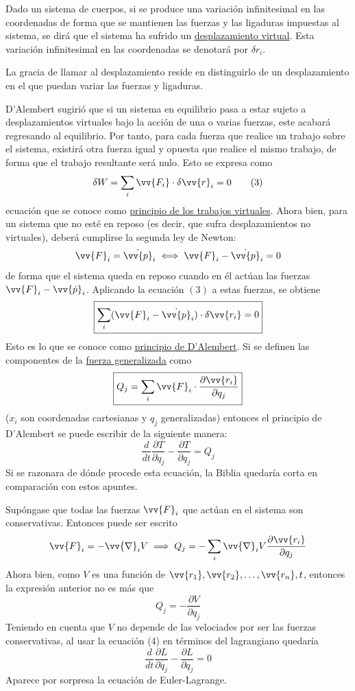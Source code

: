 \documentclass[12pt]{report}
\begin{document}
Dado un sistema de cuerpos, si se produce una variación infinitesimal en las coordenadas de forma que se mantienen las fuerzas y las ligaduras impuestas al sistema, se dirá que el sistema ha sufrido un \ul{desplazamiento virtual}. Esta variación infinitesimal en las coordenadas se denotará por $\delta r_i$. 

\vspace{2mm}
La gracia de llamar  al desplazamiento reside en distinguirlo de un desplazamiento  en el que puedan variar las fuerzas y ligaduras. 

\vspace{2mm}
D'Alembert sugirió que si un sistema en equilibrio pasa a estar sujeto a desplazamientos virtuales bajo la acción de una o varias fuerzas, este acabará regresando al equilibrio. Por tanto, para cada fuerza que realice un trabajo sobre el sistema, existirá otra fuerza igual y opuesta que realice el mismo trabajo, de forma que el trabajo resultante será nulo. Esto se expresa como
\[\delta W = \sum_i \vv{F_i} \cdot \delta \vv{r}_i = 0 \tag{3}\]
ecuación que se conoce como \ul{principio de los trabajos virtuales}. Ahora bien, para un sistema que no esté en reposo (es decir, que sufra desplazamientos no virtuales), deberá cumplirse la segunda ley de Newton:
\[\vv{F}_i = \dot{\vv{p}}_i \iff \vv{F}_i - \dot{\vv{p}}_i = 0\]
de forma que el sistema queda en reposo cuando en él actúan las fuerzas $\vv{F}_i - \vv{\dot{p}}_i$. Aplicando la ecuación $(3)$ a estas fuerzas, se obtiene
\[\boxed{\sum_i^\textrm{ } (\vv{F}_i - \dot{\vv{p}}_i) \cdot \delta \vv{r_i} = 0} \]
Esto es lo que se conoce como \ul{principio de D'Alembert}. Si se definen las componentes de la \ul{fuerza generalizada} como
\[\boxed{Q_j = \sum_i \vv{F}_i \cdot \frac{\partial \vv{r_i}}{\partial q_j}}\]
($x_i$ son coordenadas cartesianas y $q_j$ generalizadas) entonces el principio de D'Alembert se puede escribir de la siguiente manera:
\[\boxed{\frac{d}{dt}\frac{\partial T}{\partial \dot{q}_j}-\frac{\partial T}{\partial q_j} = Q_j} \tag{4}\]
Si se razonara de dónde procede esta ecuación, la Biblia quedaría corta en comparación con estos apuntes.

\vspace{2mm}
Supóngase que todas las fuerzas $\vv{F}_i$ que actúan en el sistema son conservativas. Entonces puede ser escrito
\[\vv{F}_i = - \vv{\nabla}_i V \implies Q_j = -\sum_i \vv{\nabla}_i V \frac{\partial \vv{r_i}}{\partial q_j}\]
Ahora bien, como $V$ es una función de $\vv{r_1},\vv{r_2},\mathellipsis,\vv{r_n},t$, entonces la expresión anterior no es más que
\[Q_j = -\frac{\partial V}{\partial q_j}\]
Teniendo en cuenta que $V$ no depende de las velociades por ser las fuerzas conservativas, al usar la ecuación (4) en términos del lagrangiano quedaría
\[\frac{d}{dt}\frac{\partial L}{\partial \dot{q_j}} - \frac{\partial L}{\partial q_j} = 0\]
Aparece por sorpresa la ecuación de Euler-Lagrange.
\end{document}
